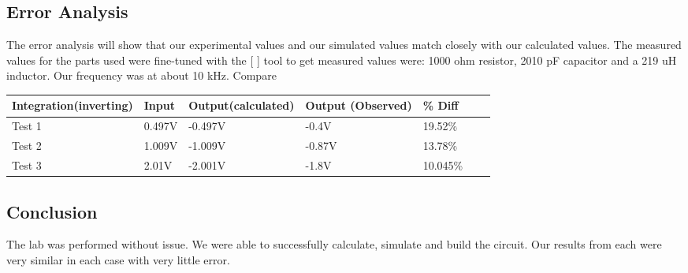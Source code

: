 \documentclass[11pt]{article}
\begin{document}
	\subsection*{Error Analysis}
	The error analysis will show that our experimental values and our simulated values match closely with our calculated values. The measured values for the parts used were fine-tuned with the [    ] tool to get measured values were: 1000 ohm resistor, 2010 pF capacitor and a 219 uH inductor. Our frequency was at about 10 kHz. Compare 
	\begin{table}[h]
		\def\arraystretch{1.2}%
		\begin{tabular}{|l|l|l|l|l|l|l|}
			\hline
			Integration(inverting)	& Input 		& Output(calculated)	& Output (Observed)	 		& \% Diff			\\ \hline
			Test 1					& 0.497V		& -0.497V				& -0.4V						&19.52\%			\\ \hline
			Test 2					& 1.009V		& -1.009V				& -0.87V					&13.78\%			\\ \hline
			Test 3					& 2.01V			& -2.001V				& -1.8V						&10.045\%			\\ \hline
		\end{tabular}
	\end{table}
	\subsection*{Conclusion}
	The lab was performed without issue. We were able to successfully calculate, simulate and build the circuit. Our results from each were very similar in each case with very little error.  
\end{document}
